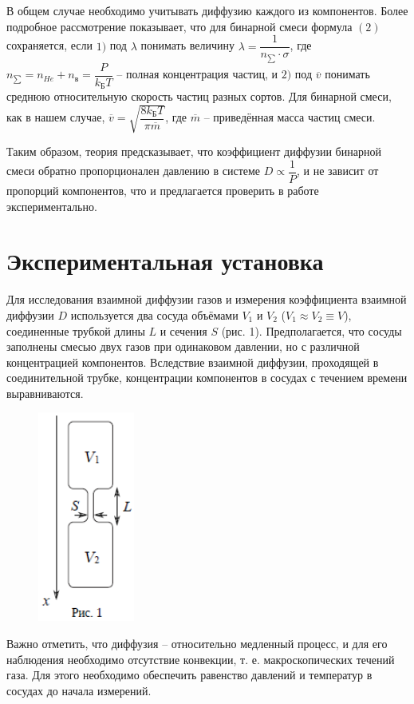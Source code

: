 \documentclass[a4paper,12pt]{article}
\begin{document}
В общем случае необходимо учитывать диффузию каждого из компонентов. Более подробное рассмотрение показывает, что для бинарной смеси формула $(2)$ сохраняется, если $1)$ под $\lambda$ понимать величину $\lambda = \dfrac{1}{n_{\sum} \cdot \sigma}$, где $n_{\sum} = n_{He} + n_{\text{в}} = \dfrac{P}{k_{\text{Б}} T}$ -- полная концентрация частиц, и $2)$ под $\overline{v}$ понимать среднюю относительную скорость частиц разных сортов. Для бинарной смеси, как в нашем случае, $\overline{v} = \sqrt{\dfrac{8 k_{\text{Б}} T}{\pi \overline{m}}}$, где $\overline{m}$ -- приведённая масса частиц смеси.

Таким образом, теория предсказывает, что коэффициент диффузии бинарной смеси обратно пропорционален давлению в системе $D \propto \dfrac{1}{P}$, и не зависит от пропорций компонентов, что и предлагается проверить в работе экспериментально.

\section{Экспериментальная установка}

Для исследования взаимной диффузии газов и измерения коэффициента взаимной диффузии $D$ используется два сосуда объёмами $V_1$ и $V_2$ ($V_1 \approx V_2 \equiv V$), соединенные трубкой длины $L$ и сечения $S$ (рис. 1). Предполагается, что сосуды заполнены смесью двух газов при одинаковом давлении, но с различной концентрацией компонентов. Вследствие взаимной диффузии, проходящей в соединительной трубке, концентрации компонентов в сосудах с течением времени выравниваются.

\begin{figure}
    \includegraphics{2211.png}
\end{figure}

Важно отметить, что диффузия -- относительно медленный процесс, и для его наблюдения необходимо отсутствие конвекции, т. е. макроскопических течений газа. Для этого необходимо обеспечить равенство давлений и температур в сосудах до начала измерений.
\end{document}
